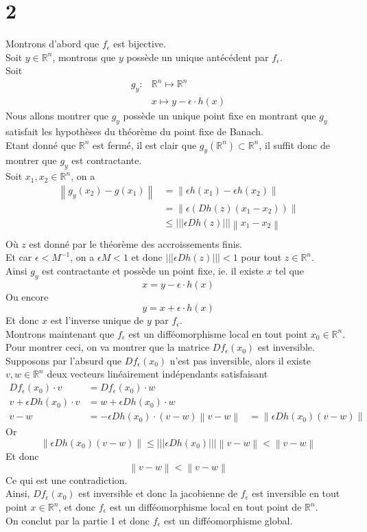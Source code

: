 \documentclass[11pt, a4paper, twoside]{article}
\newcommand\ns[1]{\left\vert\left\vert\left\vert#1\right\vert\right\vert\right\vert}
\newcommand\N[1]{\left\lVert#1\right\rVert}
\begin{document}
\section*{2}
Montrons d'abord que $f_{\epsilon} $ est bijective.\\
Soit $y \in \mathbb{R}^{n}$, montrons que $y$ possède un unique antécédent par $f_\epsilon$.\\
Soit 
\begin{align*}
	g_y\colon &\mathbb{R}^{n} \mapsto \mathbb{R}^n\\
	     &x \mapsto y - \epsilon \cdot h( x) 
\end{align*}
Nous allons montrer que $g_y$ possède un unique point fixe en montrant que $g_y$ satisfait les hypothèses du théorème du point fixe de Banach.\\
Etant donné que $ \mathbb{R}^n$ est fermé, il est clair que $g_y ( \mathbb{R}^n) \subset \mathbb{R}^n$, il suffit donc de montrer que $g_y$ est contractante.\\
Soit $x_1, x_2\in \mathbb{R}^n$, on a 
\begin{align*}
	\N { g_y( x_2) - g( x_1) } &= \N { \epsilon h( x_1) - \epsilon h( x_2) } \\
				   &= \N { \epsilon\left(  Dh( z) ( x_1-x_2) \right)} \\
				   &\leq \ns { \epsilon Dh( z) }  \N { x_1-x_2} \\
\end{align*}
Où $z$ est donné par le théorème des accroissements finis.\\
Et car $\epsilon < M^{-1}$, on a $\epsilon M <1$ et donc $\ns{\epsilon Dh( z)} <1$ pour tout $z \in \mathbb{R}^n$.\\
Ainsi $g_y$ est contractante et possède un point fixe, ie. il existe $x$ tel que
\[ 
	x = y - \epsilon \cdot h( x) 
\]
Ou encore
\[ 
	y= x + \epsilon \cdot h( x) 
\]
Et donc $x$ est l'inverse unique de $y$ par $f_\epsilon$.\\
Montrons maintenant que $f_\epsilon$ est un difféomorphisme local en tout point $x_0\in \mathbb{R}^n$.\\
Pour montrer ceci, on va montrer que la matrice $Df_\epsilon( x_0) $ est inversible.\\
Supposons par l'absurd que $Df_\epsilon( x_0) $ n'est pas inversible, alors il existe $v,w \in \mathbb{R}^n$ deux vecteurs linéairement indépendants satisfaisant
\begin{align*}
	Df_\epsilon( x_0) \cdot v &= Df_\epsilon( x_0) \cdot w\\
	v + \epsilon Dh( x_0) \cdot v &= w + \epsilon Dh( x_0) \cdot w\\
	v-w &= - \epsilon Dh( x_0)\cdot ( v-w) 
	\N { v-w} &= \N { \epsilon Dh( x_0) ( v-w) } 
\end{align*}
Or
\[ 
\N { \epsilon Dh( x_0) ( v-w) } \leq \ns { \epsilon Dh( x_0) } \N { v-w} < \N { v-w} 
\]
Et donc
\[ 
\N { v-w} < \N { v-w} 
\]
Ce qui est une contradiction.\\
Ainsi, $Df_\epsilon( x_0) $ est inversible et donc la jacobienne  de $f_\epsilon$ est inversible en tout point $x\in \mathbb{R}^n$, et donc $f_\epsilon$ est un difféomorphisme local en tout point de $ \mathbb{R}^n$.\\
On conclut par la partie 1 et donc $f_\epsilon$ est un difféomorphisme global.
\end{document}

